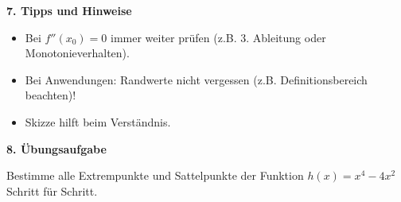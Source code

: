 \vspace{0.5em}

\textbf{7. Tipps und Hinweise}

\begin{itemize}
    \item Bei $f''(x_0)=0$ immer weiter prüfen (z.B. 3. Ableitung oder Monotonieverhalten).
    \item Bei Anwendungen: Randwerte nicht vergessen (z.B. Definitionsbereich beachten)!
    \item Skizze hilft beim Verständnis.
\end{itemize}

\vspace{0.5em}

\textbf{8. Übungsaufgabe}

Bestimme alle Extrempunkte und Sattelpunkte der Funktion $h(x) = x^4 - 4x^2$ Schritt für Schritt.